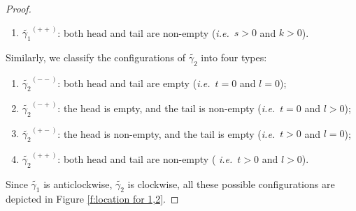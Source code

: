 \documentclass[a4paper,10pt]{amsart}
\theoremstyle{plain}          %
\theoremstyle{definition}
\newcommand{\ie}{{\em i.e.}\ }
\begin{document}
\begin{proof}
\begin{enumerate}
  \item $\widetilde{\gamma_{1}}^{(++)}$: both head and tail are non-empty (\ie $s > 0$ and $k > 0$).
\end{enumerate}
Similarly,  we classify the configurations of $\widetilde{\gamma_{2}}$ into four types:
\begin{enumerate}
 \item $\widetilde{\gamma_{2}}^{(--)}$: both head and tail are empty (\ie $t = 0$ and $l = 0$);
 \item $\widetilde{\gamma_{2}}^{(-+)}$: the head is empty, and the tail is non-empty (\ie $t = 0$ and $l > 0$);
 \item $\widetilde{\gamma_{2}}^{(+-)}$: the head is non-empty, and the tail is empty (\ie $t > 0$ and $l = 0$);
   \item $\widetilde{\gamma_{2}}^{(++)}$: both head and tail are non-empty ( \ie $t > 0$ and $l > 0$). 
\end{enumerate}

Since $\widetilde{\gamma_{1}}$ is anticlockwise, 
$\widetilde{\gamma_{2}}$ is clockwise, 
all these possible configurations are depicted in Figure \ref{f:location for 1,2}.
 

\end{proof}
\end{document}
